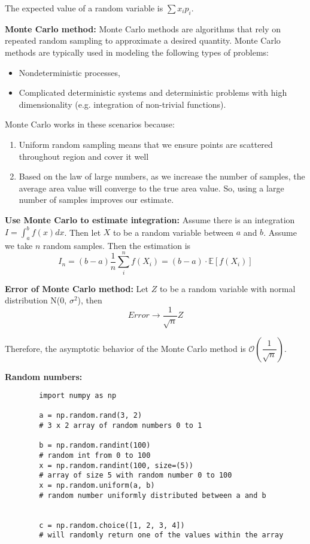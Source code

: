 \documentclass[12pt]{article}
\begin{document}
    The expected value of a random variable is $\sum x_ip_i$.

\newpage
\noindent \textbf{Monte Carlo method:} Monte Carlo methods are algorithms that rely on repeated random sampling to approximate a desired quantity. Monte Carlo methods are typically used in modeling the following types of problems:
    \begin{itemize}
        \item Nondeterministic processes,
        \item Complicated deterministic systems and deterministic problems with high dimensionality (e.g. integration of non-trivial functions).
    \end{itemize}

    Monte Carlo works in these scenarios because: 
    \begin{enumerate}
        \item Uniform random sampling means that we ensure points are scattered throughout region and cover it well
        \item Based on the law of large numbers, as we increase the number of samples, the average area value will converge to the true area value. So, using a large number of samples improves our estimate.
    \end{enumerate}

\medskip
\noindent \textbf{Use Monte Carlo to estimate integration:} Assume there is an integration $\displaystyle I = \int_a^{b} f(x) dx$. Then let $X$ to be a random variable between $a$ and $b$. Assume we take $n$ random samples. Then the estimation is
$$I_n = (b-a) \frac{1}{n} \sum_i^n f(X_i) = (b-a) \cdot \mathbb{E}[f(X_i)]$$

\medskip
\noindent \textbf{Error of Monte Carlo method:} Let $Z$ to be a random variable with normal distribution N(0, $\sigma^2$), then
$$Error \to \frac{1}{\sqrt{n}} Z$$

Therefore, the asymptotic behavior of the Monte Carlo method is $\mathcal{O}(\dfrac{1}{\sqrt{n}})$.

\medskip
\noindent \textbf{Random numbers:}
    \begin{verbatim}
        import numpy as np
    
        a = np.random.rand(3, 2)
        # 3 x 2 array of random numbers 0 to 1
        
        b = np.random.randint(100)
        # random int from 0 to 100
        x = np.random.randint(100, size=(5))
        # array of size 5 with random number 0 to 100
        x = np.random.uniform(a, b)
        # random number uniformly distributed between a and b
        
    
        c = np.random.choice([1, 2, 3, 4])
        # will randomly return one of the values within the array
    \end{verbatim}
\end{document}
